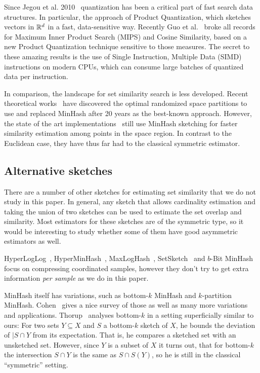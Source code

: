 Since Jegou et al. 2010~\cite{jegou2010product} quantization has been a critical part of fast search data structures.
In particular, the approach of Product Quantization, which sketches vectors in $\mathbb{R}^d$ in a fast, data-sensitive way.
Recently Guo et al.~\cite{guo2020accelerating} broke all records~\cite{aumuller2017ann} for Maximum Inner Product Search (MIPS) and Cosine Similarity, based on a new Product Quantization technique sensitive to those measures.
The secret to these amazing results is the use of Single Instruction, Multiple Data (SIMD) instructions on modern CPUs, which can consume large batches of quantized data per instruction.

In comparison, the landscape for set similarity search is less developed.
Recent theoretical works~\cite{christiani2017set, DBLP:conf/focs/AhleK20} have discovered the optimal randomized space partitions to use and replaced MinHash after 20 years as the best-known approach.
However, the state of the art implementations~\cite{christiani2018scalable} still use MinHash sketching for faster similarity estimation among points in the space region.
In contrast to the Euclidean case, they have thus far had to the classical symmetric estimator.



\subsection{Alternative sketches}

There are a number of other sketches for estimating set similarity that we do not study in this paper.
In general, any sketch that allows cardinality estimation and taking the union of two sketches can be used to estimate the set overlap and similarity.
Most estimators for these sketches are of the symmetric type, so it would be interesting to study whether some of them have good asymmetric estimators as well.

HyperLogLog~\cite{flajolet2007hyperloglog}, HyperMinHash~\cite{yu2020hyperminhash}, MaxLogHash~\cite{wang2019memory}, SetSketch~\cite{DBLP:journals/corr/abs-2101-00314} and $b$-Bit MinHash~\cite{li2010b} focus on compressing coordinated samples, however they don't try to get extra information \emph{per sample} as we do in this paper.

MinHash itself has variations, such as bottom-$k$ MinHash and $k$-partition MinHash.
Cohen~\cite{DBLP:reference/algo/Cohen16b} gives a nice survey of those as well as many more variations and applications.
Thorup~\cite{thorup2013bottom} analyses bottom-$k$ in a setting superficially similar to ours: For two sets $Y\subseteq X$ and $S$ a bottom-$k$ sketch of $X$, he bounds the deviation of $|S\cap Y$ from its expectation.
That is, he compares a sketched set with an unsketched set.
However, since $Y$ is a subset of $X$ it turns out, that for bottom-$k$ the intersection $S\cap Y$ is the same as $S\cap S(Y)$, so he is still in the classical ``symmetric'' setting.


